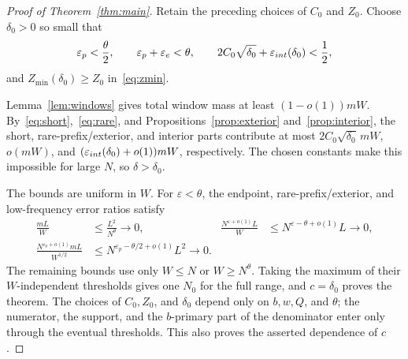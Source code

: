 \documentclass[10pt,a4paper]{amsart}
\begin{document}
\begin{proof}[Proof of Theorem~\ref{thm:main}]
Retain the preceding choices of $C_0$ and $Z_0$.
Choose $\delta_0>0$ so small that
\[
 \varepsilon_p<\frac\theta2,\qquad
 \varepsilon_p+\varepsilon_e<\theta,\qquad
 2C_0\sqrt{\delta_0}+\varepsilon_{\rm int}(\delta_0)<\frac12,
\]
and $Z_{\min}(\delta_0)\ge Z_0$ in~\eqref{eq:zmin}.

Lemma~\ref{lem:windows} gives total window mass at least $(1-o(1))mW$.
By~\eqref{eq:short},~\eqref{eq:rare}, and Propositions~\ref{prop:exterior}
and~\ref{prop:interior}, the short, rare-prefix/exterior, and interior parts
contribute at most $2C_0\sqrt{\delta_0}\,mW$, $o(mW)$, and
$(\varepsilon_{\rm int}(\delta_0)+o(1))mW$, respectively. The chosen constants
make this impossible for large $N$, so $\delta>\delta_0$.

The bounds are uniform in $W$. For $\varepsilon<\theta$, the endpoint,
rare-prefix/exterior, and low-frequency error ratios satisfy
\[
\begin{aligned}
 \frac{mL}{W}&\le\frac{L^2}{N^\theta}\to0,&
 \frac{N^{\varepsilon+o(1)}L}{W}
   &\le N^{\varepsilon-\theta+o(1)}L\to0,\\
 \frac{N^{\varepsilon_p+o(1)}mL}{W^{1/2}}
   &\le N^{\varepsilon_p-\theta/2+o(1)}L^2\to0.
\end{aligned}
\]
The remaining bounds use only $W\le N$ or $W\ge N^\theta$. Taking the maximum
of their $W$-independent thresholds gives one $N_0$ for the full range, and
$c=\delta_0$ proves the theorem. The choices of $C_0,Z_0$, and $\delta_0$
depend only on $b,w,Q$, and $\theta$; the numerator, the support, and the
$b$-primary part of the denominator enter only through the eventual
thresholds. This also proves the asserted dependence of $c$.
\end{proof}
\end{document}
